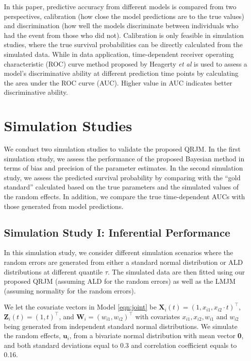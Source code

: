 \documentclass[Crown, sagev, times, doublespace]{sagej}
\begin{document}
In this paper, predictive accuracy from different models is compared from two perspectives, calibration (how close the model predictions are to the true values) and discrimination (how well the models discriminate between individuals who had the event from those who did not). Calibration is only feasible in simulation studies, where the true survival probabilities can be directly calculated from the simulated data. While in data application, time-dependent receiver operating characteristic (ROC) curve method proposed by Heagerty \emph{et al} \citep{heagerty2000time} is used to assess a model's discriminative ability at different prediction time points by calculating the area under the ROC curve (AUC). Higher value in AUC indicates better discriminative ability.

\section{Simulation Studies} \label{sec:simulation}
We conduct two simulation studies to validate the proposed QRJM. In the first simulation study, we assess the performance of the proposed Bayesian method in terms of bias and precision of the parameter estimates. In the second simulation study, we assess the predicted survival probability by comparing with the ``gold standard'' calculated based on the true parameters and the simulated values of the random effects. In addition, we compare the true time-dependent AUCs with those generated from model predictions.

\subsection{Simulation Study I: Inferential Performance }\label{sec:sim1}
In this simulation study, we consider different simulation scenarios where the random errors are generated from either a standard normal distribution or ALD distributions at different quantile $\tau$. The simulated data are then fitted using our proposed QRJM (assuming ALD for the random errors) as well as the LMJM (assuming normality for the random errors).

We let the covariate vectors in Model \eqref{eqn:joint} be ${\boldsymbol X}_i(t)=(1, x_{i1}, x_{i2}\cdot t)^{\top}$, ${\boldsymbol Z}_i(t)=(1, t)^{\top}$, and ${\boldsymbol W}_{i}=(w_{i1}, w_{i2})^{\top}$ with covariates $x_{i1}, x_{i2}, w_{i1}$ and $w_{i2}$ being generated from independent standard normal distributions. We simulate the random effects, $\boldsymbol{u}_i$, from a bivariate normal distribution with mean vector {\bf 0}, and both standard deviations equal to 0.3 and correlation coefficient equals to 0.16.
\end{document}
